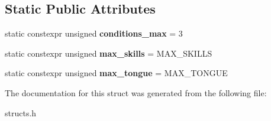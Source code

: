 \subsection*{Static Public Attributes}
\begin{DoxyCompactItemize}
\item 
\mbox{\label{structplayer__special__data__saved_a22d293ab616450fbfdfa1edb3865f1d5}} 
static constexpr unsigned {\bfseries conditions\+\_\+max} = 3
\item 
\mbox{\label{structplayer__special__data__saved_ad3a44b766f7bee282dbcef4005e55a81}} 
static constexpr unsigned {\bfseries max\+\_\+skills} = M\+A\+X\+\_\+\+S\+K\+I\+L\+LS
\item 
\mbox{\label{structplayer__special__data__saved_af225cec55ec4a82450540cccb6dcf733}} 
static constexpr unsigned {\bfseries max\+\_\+tongue} = M\+A\+X\+\_\+\+T\+O\+N\+G\+UE
\end{DoxyCompactItemize}


The documentation for this struct was generated from the following file\+:\begin{DoxyCompactItemize}
\item 
structs.\+h\end{DoxyCompactItemize}
